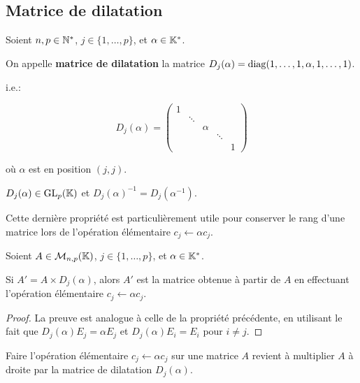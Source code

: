 \documentclass[12pt, a4paper]{report}
\begin{document}
\subsection{Matrice de dilatation}

\begin{definition}
    Soient $n,p \in \mathbb{N}^*$, $j \in \{1,\dots,p\}$, et $\alpha \in \mathbb{K}^*$.

    On appelle \textbf{matrice de dilatation} la matrice $D_j(\alpha) = \mathrm{diag}(1,\dots,1,\alpha,1,\dots,1)$.

    i.e.:

    $$D_j(\alpha) = \left(\begin{matrix}
        1 & & & & \\
        & \ddots & & & \\
        & & \alpha & & \\
        & & & \ddots & \\
        & & & & 1
    \end{matrix}\right)$$

    où $\alpha$ est en position $(j,j)$.
\end{definition}

\begin{property}
    $D_j(\alpha) \in \mathrm{GL}_p(\mathbb{K})$ et $D_j(\alpha)^{-1} = D_j(\alpha^{-1})$.
\end{property}

\begin{methodbox}
    Cette dernière propriété est particulièrement utile pour conserver le rang d'une matrice lors de l'opération élémentaire $c_j \leftarrow \alpha c_j$.
\end{methodbox}

\begin{property}
    Soient $A \in \mathcal M_{n,p}(\mathbb{K})$, $j \in \{1,\dots,p\}$, et $\alpha \in \mathbb{K}^*$.

    Si $A' = A \times D_j(\alpha)$, alors $A'$ est la matrice obtenue à partir de $A$ en effectuant l'opération élémentaire $c_j \leftarrow \alpha c_j$.
\end{property}

\begin{proof}
    La preuve est analogue à celle de la propriété précédente, en utilisant le fait que $D_j(\alpha) E_j = \alpha E_j$ et $D_j(\alpha) E_i = E_i$ pour $i \ne j$.
\end{proof}

\begin{remark}
    Faire l'opération élémentaire $c_j \leftarrow \alpha c_j$ sur une matrice $A$ revient à multiplier $A$ à droite par la matrice de dilatation $D_j(\alpha)$.
\end{remark}
\end{document}
